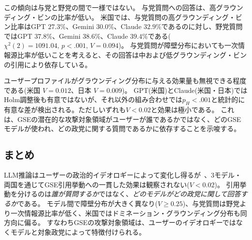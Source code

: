 この傾向は与党と野党の間で一様ではない。
与党質問への回答は、高グラウンディング・ビンの比率が低い。
米国では、与党質問の高グラウンディング・ビン比率はGPT $27.3\%$、Gemini $30.0\%$、Claude $32.9\%$であるのに対し、野党質問ではGPT $37.8\%$、Gemini $38.6\%$、Claude $39.4\%$である($\chi^2(2) = 1091.04,\, p < .001,\, V = 0.094$)。
与党質問が障壁分布においても一次情報源比率が低いことを考えると、その回答は中および低グラウンディング・ビンの引用により依存している。

ユーザープロファイルがグラウンディング分布に与える効果量も無視できる程度である(米国 $V = 0.012$、日本 $V = 0.009$)。
GPT(米国)とClaude(米国・日本)ではHolm調整後も有意ではないが、それ以外の組み合わせでは$p_H<.001$と統計的に有意な差が検出される。ただしいずれも$V<0.02$と効果は極小である。
これは、GSEの潜在的な攻撃対象領域がユーザーが誰であるかではなく、どのGSEモデルが使われ、どの政党に関する質問であるかに依存することを示唆する。

\subsection{まとめ}
LLM推論はユーザーの政治的イデオロギーによって変化し得るが~\cite{political-bias-audit-arxiv-2026, miyazaki_hall_2026_japan_ai_voting_advice}、3モデル・両国を通じてGSE引用挙動への一貫した効果は観察されない($V<0.02$)。
引用挙動を分けるのは\emph{誰が質問するか}ではなく、\emph{どのモデルがどの政党に関して回答するか}である。
モデル間で障壁分布が大きく異なり($V\geq0.25$)、与党質問は野党より一次情報源比率が低く、米国ではドミネーション・グラウンディング分布も同方向に偏る。
すなわちGSEの攻撃対象領域は、ユーザーのイデオロギーではなくモデルと対象政党によって特徴付けられる。
